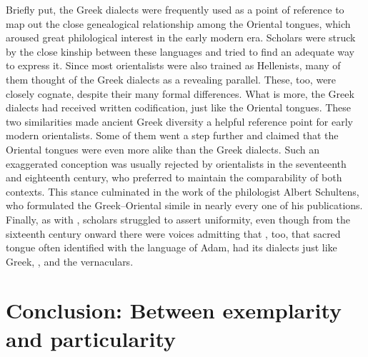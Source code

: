 Briefly put, the Greek dialects were frequently used as a point of reference to map out the close genealogical relationship among the Oriental tongues, which aroused great philological interest in the early modern era. Scholars were struck by the close kinship between these languages and tried to find an adequate way to express it. Since most orientalists were also trained as Hellenists, many of them thought of the Greek dialects as a revealing parallel. These, too, were closely cognate, despite their many formal differences. What is more, the Greek dialects had received written codification, just like the Oriental tongues. These two similarities made ancient Greek diversity a helpful reference point for early modern orientalists. Some of them went a step further and claimed that the Oriental tongues were even more alike than the Greek dialects. Such an exaggerated conception was usually rejected by orientalists in the seventeenth and eighteenth century, who preferred to maintain the comparability of both contexts. This stance culminated in the work of the  philologist Albert Schultens, who formulated the Greek–Oriental simile in nearly every one of his publications. Finally, as with , scholars struggled to assert  uniformity, even though from the sixteenth century onward there were voices admitting that , too, that sacred tongue often identified with the language of Adam, had its dialects just like Greek, , and the vernaculars.

\section{Conclusion: Between exemplarity and particularity}\label{sec:8.4}

